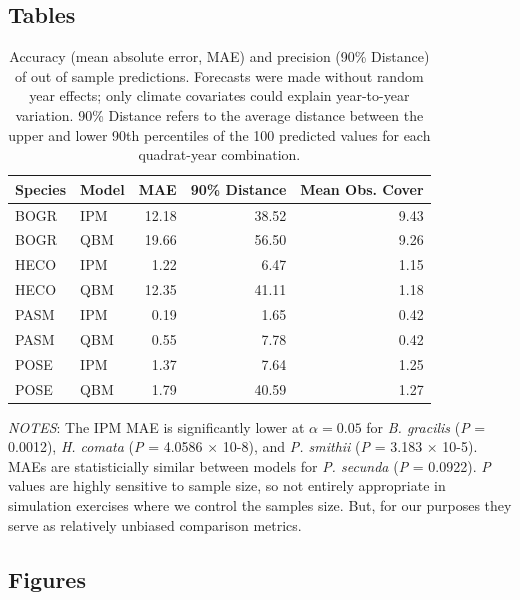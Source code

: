 \documentclass[12pt,]{article}
\begin{document}
\pagebreak{}

\subsection{Tables}\label{tables}

\begin{table}[ht]
\centering
\caption{Accuracy (mean absolute error, MAE) and precision (90\% Distance) of out of sample predictions. Forecasts were made without random year effects; only climate covariates could explain year-to-year variation. 90\% Distance refers to the average distance between the upper and lower 90th percentiles of the 100 predicted values for each quadrat-year combination.} 
\begin{tabular}{llrrr}
  \hline
Species & Model & MAE & 90\% Distance & Mean Obs. Cover \\ 
  \hline
BOGR & IPM & 12.18 & 38.52 & 9.43 \\ 
  BOGR & QBM & 19.66 & 56.50 & 9.26 \\ 
  HECO & IPM & 1.22 & 6.47 & 1.15 \\ 
  HECO & QBM & 12.35 & 41.11 & 1.18 \\ 
  PASM & IPM & 0.19 & 1.65 & 0.42 \\ 
  PASM & QBM & 0.55 & 7.78 & 0.42 \\ 
  POSE & IPM & 1.37 & 7.64 & 1.25 \\ 
  POSE & QBM & 1.79 & 40.59 & 1.27 \\ 
   \hline
\end{tabular}
\end{table}

\emph{NOTES}: The IPM MAE is significantly lower at $\alpha=0.05$ for
\emph{B. gracilis} (\emph{P} = 0.0012), \emph{H. comata} (\emph{P} =
4.0586 × 10-8), and \emph{P. smithii} (\emph{P} = 3.183 × 10-5). MAEs
are statisticially similar between models for \emph{P. secunda}
(\emph{P} = 0.0922). \emph{P} values are highly sensitive to sample
size, so not entirely appropriate in simulation exercises where we
control the samples size. But, for our purposes they serve as relatively
unbiased comparison metrics.

\pagebreak{}

\pagebreak{}

\subsection{Figures}\label{figures}
\end{document}
